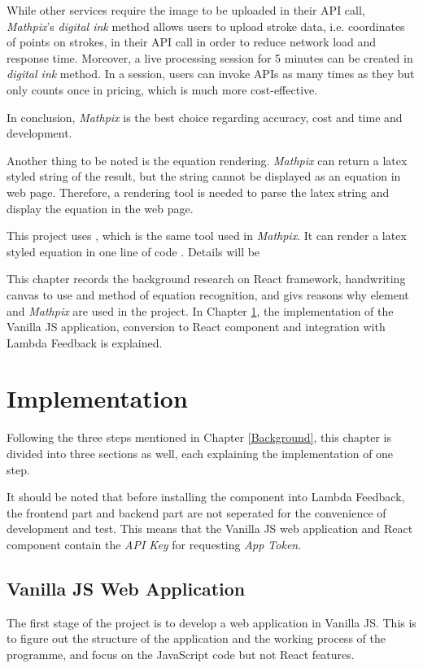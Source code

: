 \documentclass[12pt,twoside]{report}
\begin{document}
While other services require the image to be uploaded in their API call,
\textit{Mathpix}'s \textit{digital ink} method allows users to upload stroke
data, i.e. coordinates of points on strokes, in their API call in order to
reduce network load and response time. Moreover, a live processing session for 5
minutes can be created in \textit{digital ink} method. In a session, users can
invoke APIs as many times as they but only counts once in pricing, which is much
more cost-effective.

In conclusion, \textit{Mathpix} is the best choice regarding accuracy, cost and time and development.

Another thing to be noted is the equation rendering. \textit{Mathpix} can return a latex styled string of the result, but the string cannot be displayed as an equation in web page. Therefore, a rendering tool is needed to parse the latex string and display the equation in the web page. 

This project uses , which is the same tool used in \textit{Mathpix}. It can render a latex styled equation in one line of code \cite{web:katexapi}. Details will be 

This chapter records the background research on React framework, handwriting canvas to use and method of equation recognition, and givs reasons why  element and \textit{Mathpix} are used in the project. In Chapter \ref{Implementation}, the implementation of the Vanilla JS application, conversion to React component and integration with Lambda Feedback is explained.



\chapter{Implementation}
\label{Implementation}

Following the three steps mentioned in Chapter \ref{Background}, this chapter is divided into three sections as well, each explaining the implementation of one step.

It should be noted that before installing the component into Lambda Feedback, the frontend part and backend part are not seperated for the convenience of development and test. This means that the Vanilla JS web application and React component contain the \textit{API Key} for requesting \textit{App Token}.

\section{Vanilla JS Web Application}
\label{vanillajs-implement}
The first stage of the project is to develop a web application in Vanilla JS. This is to figure out the structure of the application and the working process of the programme, and focus on the JavaScript code but not React features.
\end{document}
